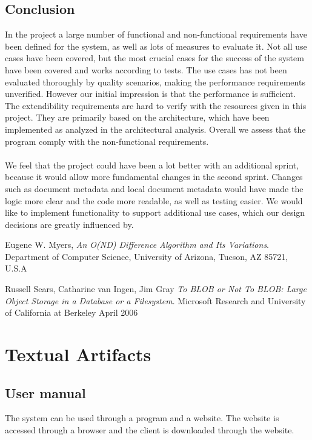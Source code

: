\documentclass[a4paper,11pt,report]{report}
\begin{document}
\section{Conclusion}
In the project a large number of functional and non-functional requirements have been defined for the system, as well as lots of measures to evaluate it. Not all use cases have been covered, but the most crucial cases for the success of the system have been covered and works according to tests. The use cases has not been evaluated thoroughly by quality scenarios, making the performance requirements unverified. However our initial impression is that the performance is sufficient. The extendibility requirements are hard to verify with the resources given in this project. They are primarily based on the architecture, which have been implemented as analyzed in the architectural analysis. Overall we assess that the program comply with the non-functional requirements. \\ \\
We feel that the project could have been a lot better with an additional sprint, because it would allow more fundamental changes in the second sprint. Changes such as document metadata and local document metadata would have made the logic more clear and the code more readable, as well as testing easier. We would like to implement functionality to support additional use cases, which our design decisions are greatly influenced by.



\begin{thebibliography}{99}
  Eugene W. Myers,
  \emph{An O(ND) Difference Algorithm and Its Variations}.
  Department of Computer Science, University of Arizona, Tucson, AZ 85721, U.S.A

  Russell Sears, Catharine van Ingen, Jim Gray
  \emph{To BLOB or Not To BLOB: 
Large Object Storage in a Database or a Filesystem}.
  Microsoft Research and University of California at Berkeley
  April 2006

\end{thebibliography}

\appendix

\chapter{Textual Artifacts}

\section{User manual}
The system can be used through a program and a website. The website is accessed through a browser and the client is downloaded through the website.
\end{document}
